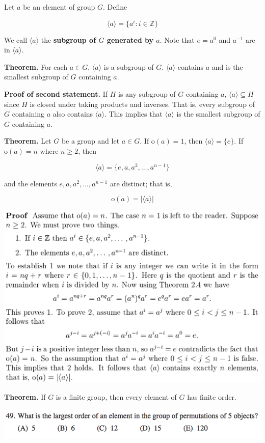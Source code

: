 \documentclass{article}
\begin{document}
Let \(a\) be an element of group \(G\). Define

\[
\langle a \rangle = \{a^i  : i \in \mathbb{Z} \}
\]

We call \(\langle a \rangle\) the \textbf{subgroup of \(G\) generated by \(a\)}. Note that \(e = a^0\) and \(a^{-1}\) are in \(\langle a \rangle\).

\textbf{Theorem.} For each \(a \in G\), \(\langle a \rangle\) is a subgroup of \(G\). \(\langle a \rangle\) contains \(a\) and is the smallest subgroup of \(G\) containing \(a\). 

\textbf{Proof of second statement.} If \(H\) is any subgroup of \(G\) containing \(a\), \(\langle a \rangle \subseteq H \) since \(H\) is closed under taking products and inverses. That is, every subgroup of \(G\) containing \(a\) also contains \(\langle a \rangle\). This implies that \(\langle a \rangle\) is the smallest subgroup of \(G\) containing \(a\).

\pagebreak 
\textbf{Theorem.} Let \(G\) be a group and let \(a \in G\). If \(\text{o}(a) = 1\), then \(\langle a \rangle = \{e \}\). If \(\text{o}(a) = n\) where \(n \geq 2\), then

\[
\langle a \rangle = \{e, a, a^2, \ldots, a^{n-1} \}
\]

and the elements \(e, a, a^2, \ldots, a^{n-1}\) are distinct; that is, 

\[
\text{o}(a) = | \langle a \rangle |
\]

\includegraphics[scale=0.4]{ch4_proof}

\textbf{Theorem.} If \(G\) is a finite group, then every element of \(G\) has finite order.

\includegraphics[scale=0.65]{1268_49}
\end{document}
